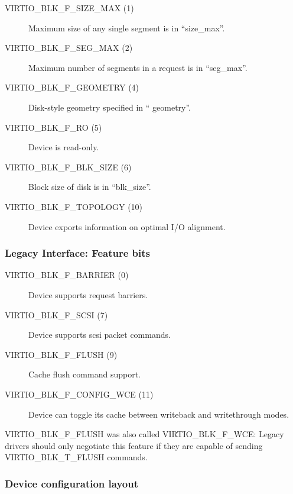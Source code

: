 \begin{description}
\item[VIRTIO_BLK_F_SIZE_MAX (1)] Maximum size of any single segment is
    in “size_max”.

\item[VIRTIO_BLK_F_SEG_MAX (2)] Maximum number of segments in a
    request is in “seg_max”.

\item[VIRTIO_BLK_F_GEOMETRY (4)] Disk-style geometry specified in “
    geometry”.

\item[VIRTIO_BLK_F_RO (5)] Device is read-only.

\item[VIRTIO_BLK_F_BLK_SIZE (6)] Block size of disk is in “blk_size”.

\item[VIRTIO_BLK_F_TOPOLOGY (10)] Device exports information on optimal I/O
    alignment.
\end{description}

\subsubsection{Legacy Interface: Feature bits}\label{sec:Device Types / Block Device / Feature bits / Legacy Interface: Feature bits}

\begin{description}
\item[VIRTIO_BLK_F_BARRIER (0)] Device supports request barriers.

\item[VIRTIO_BLK_F_SCSI (7)] Device supports scsi packet commands.

\item[VIRTIO_BLK_F_FLUSH (9)] Cache flush command support.

\item[VIRTIO_BLK_F_CONFIG_WCE (11)] Device can toggle its cache between writeback
    and writethrough modes.
\end{description}

VIRTIO_BLK_F_FLUSH was also called VIRTIO_BLK_F_WCE: Legacy drivers
should only negotiate this feature if they are capable of sending
VIRTIO_BLK_T_FLUSH commands.

\subsubsection{Device configuration layout}\label{sec:Device Types / Block Device / Feature bits / Device configuration layout}

